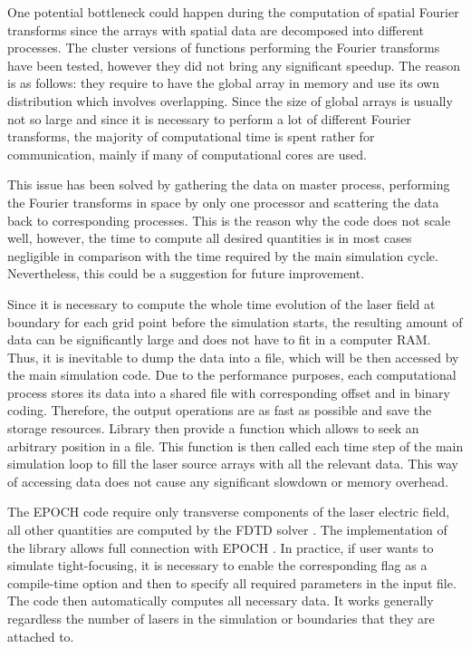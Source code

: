 One potential bottleneck could happen during the computation of spatial Fourier transforms since the arrays with spatial data are decomposed into different processes. The cluster versions of functions performing the Fourier transforms have been tested, however they did not bring any significant speedup. The reason is as follows: they require to have the global array in memory and use its own distribution which involves overlapping. Since the size of global arrays is usually not so large and since it is necessary to perform a lot of different Fourier transforms, the majority of computational time is spent rather for communication, mainly if many of computational cores are used.

This issue has been solved by gathering the data on master process, performing the Fourier transforms in space by only one processor and scattering the data back to corresponding processes. This is the reason why the code does not scale well, however, the time to compute all desired quantities is in most cases negligible in comparison with the time required by the main simulation cycle. Nevertheless, this could be a suggestion for future improvement.

Since it is necessary to compute the whole time evolution of the laser field at boundary for each grid point before the simulation starts, the resulting amount of data can be significantly large and does not have to fit in a computer RAM. Thus, it is inevitable to dump the data into a file, which will be then accessed by the main simulation code. Due to the performance purposes, each computational process stores its data into a shared file with corresponding offset and in binary coding. Therefore, the output operations are as fast as possible and save the storage resources. Library then provide a function which allows to seek an arbitrary position in a file. This function is then called each time step of the main simulation loop to fill the laser source arrays with all the relevant data. This way of accessing data does not cause any significant slowdown or memory overhead.

The EPOCH \cite{bennett} code require only transverse components of the laser electric field, all other quantities are computed by the FDTD solver \cite{ruhl}. The implementation of the library allows full connection with EPOCH \cite{bennett}. In practice, if user wants to simulate tight-focusing, it is necessary to enable the corresponding flag as a compile-time option and then to specify all required parameters in the input file. The code then automatically computes all necessary data. It works generally regardless the number of lasers in the simulation or boundaries that they are attached to.

